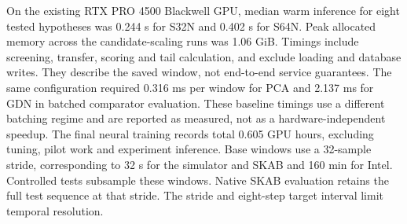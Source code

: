 On the existing RTX PRO 4500 Blackwell GPU, median warm inference for eight tested hypotheses was 0.244 s for S32N and 0.402 s for S64N. Peak allocated memory across the candidate-scaling runs was 1.06 GiB. Timings include screening, transfer, scoring and tail calculation, and exclude loading and database writes. They describe the saved window, not end-to-end service guarantees. The same configuration required 0.316 ms per window for PCA and 2.137 ms for GDN in batched comparator evaluation. These baseline timings use a different batching regime and are reported as measured, not as a hardware-independent speedup. The final neural training records total 0.605 GPU hours, excluding tuning, pilot work and experiment inference. Base windows use a 32-sample stride, corresponding to 32 s for the simulator and SKAB and 160 min for Intel. Controlled tests subsample these windows. Native SKAB evaluation retains the full test sequence at that stride. The stride and eight-step target interval limit temporal resolution.
